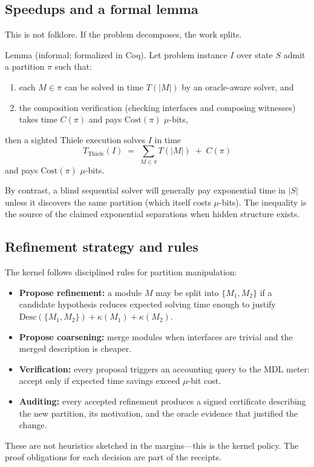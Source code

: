 \documentclass[11pt]{article}
\begin{document}
\subsection{Speedups and a formal lemma}
This is not folklore. If the problem decomposes, the work splits.

Lemma (informal; formalized in Coq). Let problem instance $I$ over state $S$ admit a partition $\pi$ such that:
\begin{enumerate}
  \item each $M\in\pi$ can be solved in time $T(|M|)$ by an oracle-aware solver, and
  \item the composition verification (checking interfaces and composing witnesses) takes time $C(\pi)$ and pays $\mathrm{Cost}(\pi)$ $\mu$-bits,
\end{enumerate}
then a sighted Thiele execution solves $I$ in time
\[
T_{\mathrm{Thiele}}(I) \;=\; \sum_{M\in\pi} T(|M|) \;+\; C(\pi)
\]
and pays $\mathrm{Cost}(\pi)$ $\mu$-bits.

By contrast, a blind sequential solver will generally pay exponential time in $|S|$ unless it discovers the same partition (which itself costs $\mu$-bits). The inequality is the source of the claimed exponential separations when hidden structure exists.

\subsection{Refinement strategy and rules}
The kernel follows disciplined rules for partition manipulation:
\begin{itemize}
  \item \textbf{Propose refinement:} a module $M$ may be split into $\{M_1,M_2\}$ if a candidate hypothesis reduces expected solving time enough to justify $\mathrm{Desc}(\{M_1,M_2\})+\kappa(M_1)+\kappa(M_2)$.
  \item \textbf{Propose coarsening:} merge modules when interfaces are trivial and the merged description is cheaper.
  \item \textbf{Verification:} every proposal triggers an accounting query to the MDL meter: accept only if expected time savings exceed $\mu$-bit cost.
  \item \textbf{Auditing:} every accepted refinement produces a signed certificate describing the new partition, its motivation, and the oracle evidence that justified the change.
\end{itemize}
These are not heuristics sketched in the margins—this is the kernel policy. The proof obligations for each decision are part of the receipts.
\end{document}
